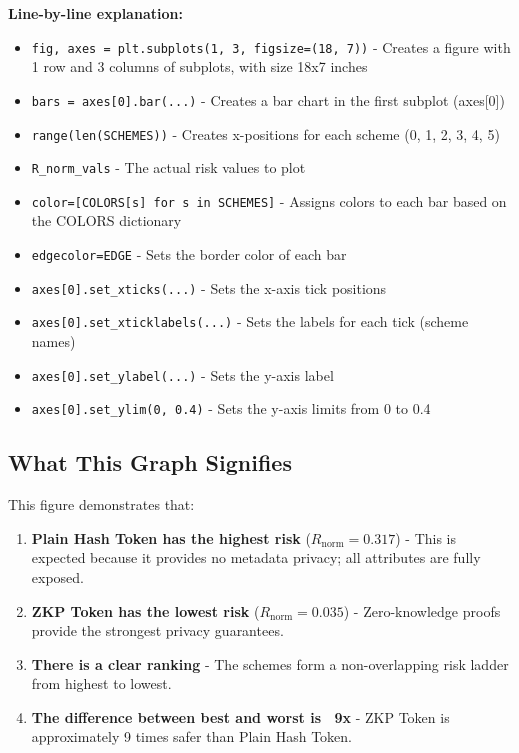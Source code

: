 \documentclass[12pt,a4paper,oneside,openany]{report}
\begin{document}
\textbf{Line-by-line explanation:}
\begin{itemize}
    \item \texttt{fig, axes = plt.subplots(1, 3, figsize=(18, 7))} - Creates a figure with 1 row and 3 columns of subplots, with size 18x7 inches
    \item \texttt{bars = axes[0].bar(...)} - Creates a bar chart in the first subplot (axes[0])
    \item \texttt{range(len(SCHEMES))} - Creates x-positions for each scheme (0, 1, 2, 3, 4, 5)
    \item \texttt{R\_norm\_vals} - The actual risk values to plot
    \item \texttt{color=[COLORS[s] for s in SCHEMES]} - Assigns colors to each bar based on the COLORS dictionary
    \item \texttt{edgecolor=EDGE} - Sets the border color of each bar
    \item \texttt{axes[0].set\_xticks(...)} - Sets the x-axis tick positions
    \item \texttt{axes[0].set\_xticklabels(...)} - Sets the labels for each tick (scheme names)
    \item \texttt{axes[0].set\_ylabel(...)} - Sets the y-axis label
    \item \texttt{axes[0].set\_ylim(0, 0.4)} - Sets the y-axis limits from 0 to 0.4
\end{itemize}

\subsection{What This Graph Signifies}
This figure demonstrates that:
\begin{enumerate}
    \item \textbf{Plain Hash Token has the highest risk} ($R_{\mathrm{norm}} = 0.317$) - This is expected because it provides no metadata privacy; all attributes are fully exposed.
    \item \textbf{ZKP Token has the lowest risk} ($R_{\mathrm{norm}} = 0.035$) - Zero-knowledge proofs provide the strongest privacy guarantees.
    \item \textbf{There is a clear ranking} - The schemes form a non-overlapping risk ladder from highest to lowest.
    \item \textbf{The difference between best and worst is ~9x} - ZKP Token is approximately 9 times safer than Plain Hash Token.
\end{enumerate}
\end{document}
